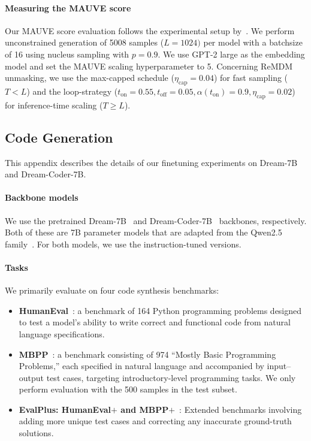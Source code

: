 \documentclass{article}
\begin{document}
\paragraph{Measuring the MAUVE score}
Our MAUVE score evaluation follows the experimental setup by~\cite{wang_remasking_2025}. 
% 
We perform unconstrained generation of 5008 samples ($L=1024)$ per model with a batchsize of 16 using nucleus sampling with $p=0.9$. 
% 
We use GPT-2 large as the embedding model and set the MAUVE scaling hyperparameter to 5. 
% 
Concerning ReMDM unmasking, we use the max-capped schedule ($\eta_{\text{cap}}=0.04$) for fast sampling ($T<L$) and the loop-strategy ($t_{\text{on}}=0.55, t_{\text{off}}=0.05,\alpha(t_{\text{on}})=0.9, \eta_{\text{cap}}=0.02$) for inference-time scaling ($T\geq L$). 

\subsection{Code Generation}\label{app:finetuning-large}
This appendix describes the details of our finetuning experiments on Dream-7B and Dream-Coder-7B. 

\paragraph{Backbone models} 
\label{sec:backbones}
%
We use the pretrained Dream-7B~\citep{ye_dream_2025} and Dream-Coder-7B~\citep{xie_dream-coder_2025} backbones, respectively. 
%
Both of these are 7B parameter models that are adapted from the Qwen2.5 family~\citep{qwen_qwen25_2025, hui_qwen25-coder_2024}.
%
For both models, we use the instruction-tuned versions.

\paragraph{Tasks} We primarily evaluate on four code synthesis benchmarks:
\begin{itemize}
    \item \textbf{HumanEval}~\cite{chen_evaluating_2021}: a benchmark of 164 Python programming problems designed to test a model’s ability to write correct and functional code from natural language specifications.
    \item \textbf{MBPP}~\cite{mbpp_2021}: a benchmark consisting of 974 “Mostly Basic Programming Problems,” each specified in natural language and accompanied by input–output test cases, targeting introductory-level programming tasks. We only perform evaluation with the 500 samples in the test subset.
    \item \textbf{EvalPlus: HumanEval$\mathbf{+}$ and MBPP$\mathbf{+}$}~\cite{evalplus_2023}: Extended benchmarks involving adding more unique test cases and correcting any inaccurate ground-truth solutions. 
\end{itemize}
\end{document}
